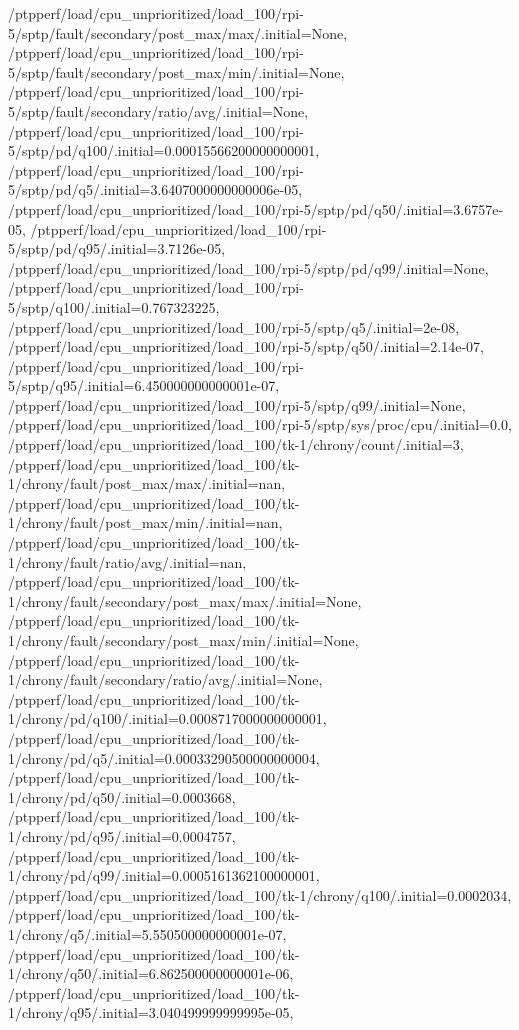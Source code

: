 {    /ptpperf/load/cpu_unprioritized/load_100/rpi-5/sptp/fault/secondary/post_max/max/.initial=None,
    /ptpperf/load/cpu_unprioritized/load_100/rpi-5/sptp/fault/secondary/post_max/min/.initial=None,
    /ptpperf/load/cpu_unprioritized/load_100/rpi-5/sptp/fault/secondary/ratio/avg/.initial=None,
    /ptpperf/load/cpu_unprioritized/load_100/rpi-5/sptp/pd/q100/.initial=0.00015566200000000001,
    /ptpperf/load/cpu_unprioritized/load_100/rpi-5/sptp/pd/q5/.initial=3.6407000000000006e-05,
    /ptpperf/load/cpu_unprioritized/load_100/rpi-5/sptp/pd/q50/.initial=3.6757e-05,
    /ptpperf/load/cpu_unprioritized/load_100/rpi-5/sptp/pd/q95/.initial=3.7126e-05,
    /ptpperf/load/cpu_unprioritized/load_100/rpi-5/sptp/pd/q99/.initial=None,
    /ptpperf/load/cpu_unprioritized/load_100/rpi-5/sptp/q100/.initial=0.767323225,
    /ptpperf/load/cpu_unprioritized/load_100/rpi-5/sptp/q5/.initial=2e-08,
    /ptpperf/load/cpu_unprioritized/load_100/rpi-5/sptp/q50/.initial=2.14e-07,
    /ptpperf/load/cpu_unprioritized/load_100/rpi-5/sptp/q95/.initial=6.450000000000001e-07,
    /ptpperf/load/cpu_unprioritized/load_100/rpi-5/sptp/q99/.initial=None,
    /ptpperf/load/cpu_unprioritized/load_100/rpi-5/sptp/sys/proc/cpu/.initial=0.0,
    /ptpperf/load/cpu_unprioritized/load_100/tk-1/chrony/count/.initial=3,
    /ptpperf/load/cpu_unprioritized/load_100/tk-1/chrony/fault/post_max/max/.initial=nan,
    /ptpperf/load/cpu_unprioritized/load_100/tk-1/chrony/fault/post_max/min/.initial=nan,
    /ptpperf/load/cpu_unprioritized/load_100/tk-1/chrony/fault/ratio/avg/.initial=nan,
    /ptpperf/load/cpu_unprioritized/load_100/tk-1/chrony/fault/secondary/post_max/max/.initial=None,
    /ptpperf/load/cpu_unprioritized/load_100/tk-1/chrony/fault/secondary/post_max/min/.initial=None,
    /ptpperf/load/cpu_unprioritized/load_100/tk-1/chrony/fault/secondary/ratio/avg/.initial=None,
    /ptpperf/load/cpu_unprioritized/load_100/tk-1/chrony/pd/q100/.initial=0.0008717000000000001,
    /ptpperf/load/cpu_unprioritized/load_100/tk-1/chrony/pd/q5/.initial=0.00033290500000000004,
    /ptpperf/load/cpu_unprioritized/load_100/tk-1/chrony/pd/q50/.initial=0.0003668,
    /ptpperf/load/cpu_unprioritized/load_100/tk-1/chrony/pd/q95/.initial=0.0004757,
    /ptpperf/load/cpu_unprioritized/load_100/tk-1/chrony/pd/q99/.initial=0.0005161362100000001,
    /ptpperf/load/cpu_unprioritized/load_100/tk-1/chrony/q100/.initial=0.0002034,
    /ptpperf/load/cpu_unprioritized/load_100/tk-1/chrony/q5/.initial=5.550500000000001e-07,
    /ptpperf/load/cpu_unprioritized/load_100/tk-1/chrony/q50/.initial=6.862500000000001e-06,
    /ptpperf/load/cpu_unprioritized/load_100/tk-1/chrony/q95/.initial=3.040499999999995e-05,
}
